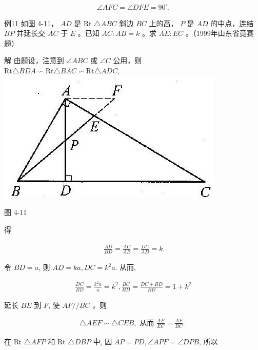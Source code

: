 \documentclass[10pt]{article}
\begin{document}
\begin{align*}
\angle A F C=\angle D F E=90^{\circ} .
\end{align*}

例11 如图 4-11， $A D$ 是 Rt $\triangle A B C$ 斜边 $B C$ 上的高， $P$ 是 $A D$ 的中点，连结 $B P$ 并延长交 $A C$ 于 $E$ 。已知 $A C: A B=k$ 。求 $A E: E C$ 。（1999年山东省竟赛题）

解 由题设，注意到 $\angle A B C$ 或 $\angle C$ 公用，则\\
$\mathrm{Rt} \triangle B D A \backsim \mathrm{Rt} \triangle B A C \backsim \mathrm{Rt} \triangle A D C$,\\
\includegraphics[max width=\textwidth, center]{2024_10_30_2c8f45efd4a519b08e1ag-042(1)}

图 4-11

得

\begin{align*}
\frac{A D}{B D}=\frac{A C}{A B}=\frac{D \dot{C}}{A D}=k
\end{align*}

令 $B D=a$, 则 $A D=k a, D C=k^{2} a$. 从而,

\begin{align*}
\frac{D C}{B D}=\frac{k^{2} a}{a}=k^{2}, \frac{B C}{B D}=\frac{D C+B D}{B D}=1+k^{2}
\end{align*}

延长 $B E$ 到 $F$, 使 $A F / / B C$ ，则

\begin{align*}
\triangle A E F \backsim \triangle C E B, \text { 从而 } \frac{A E}{E C}=\frac{A F}{B C} \text {. }
\end{align*}

在 Rt $\triangle A F P$ 和 Rt $\triangle D B P$ 中, 因 $A P=P D, \angle A P F=\angle D P B$, 所以
\end{document}
